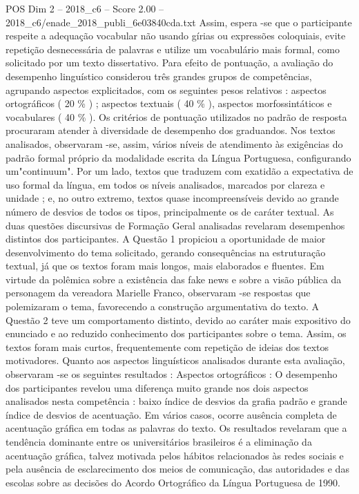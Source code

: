 \begin{textsample}{POS Dim 2 – 2018\_c6 – Score 2.00 – 2018\_c6/enade\_2018\_publi\_6e03840cda.txt}
Assim, espera -se que o participante respeite a adequação vocabular não usando gírias ou expressões coloquiais, evite repetição desnecessária de palavras e utilize um vocabulário mais formal, como solicitado por um texto dissertativo.
Para efeito de pontuação, a avaliação do desempenho linguístico considerou três grandes grupos de competências, agrupando aspectos explicitados, com os seguintes pesos relativos : aspectos ortográficos ( 20 \% ) ; aspectos textuais ( 40 \% ), aspectos morfossintáticos e vocabulares ( 40 \% ).
Os critérios de pontuação utilizados no padrão de resposta procuraram atender à diversidade de desempenho dos graduandos.
Nos textos analisados, observaram -se, assim, vários níveis de atendimento às exigências do padrão formal próprio da modalidade escrita da Língua Portuguesa, configurando um"continuum".
Por um lado, textos que traduzem com exatidão a expectativa de uso formal da língua, em todos os níveis analisados, marcados por clareza e unidade ; e, no outro extremo, textos quase incompreensíveis devido ao grande número de desvios de todos os tipos, principalmente os de caráter textual.
As duas questões discursivas de Formação Geral analisadas revelaram desempenhos distintos dos participantes.
A Questão 1 propiciou a oportunidade de maior desenvolvimento do tema solicitado, gerando consequências na estruturação textual, já que os textos foram mais longos, mais elaborados e fluentes.
Em virtude da polêmica sobre a existência das fake news e sobre a visão pública da personagem da vereadora Marielle Franco, observaram -se respostas que polemizaram o tema, favorecendo a construção argumentativa do texto.
A Questão 2 teve um comportamento distinto, devido ao caráter mais expositivo do enunciado e ao reduzido conhecimento dos participantes sobre o tema.
Assim, os textos foram mais curtos, frequentemente com repetição de ideias dos textos motivadores.
Quanto aos aspectos linguísticos analisados durante esta avaliação, observaram -se os seguintes resultados : Aspectos ortográficos : O desempenho dos participantes revelou uma diferença muito grande nos dois aspectos analisados nesta competência : baixo índice de desvios da grafia padrão e grande índice de desvios de acentuação.
Em vários casos, ocorre ausência completa de acentuação gráfica em todas as palavras do texto.
Os resultados revelaram que a tendência dominante entre os universitários brasileiros é a eliminação da acentuação gráfica, talvez motivada pelos hábitos relacionados às redes sociais e pela ausência de esclarecimento dos meios de comunicação, das autoridades e das escolas sobre as decisões do Acordo Ortográfico da Língua Portuguesa de 1990.

\end{textsample}
